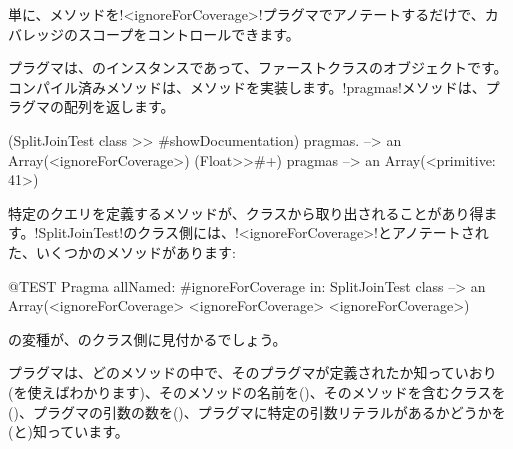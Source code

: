 \documentclass[a4paper,10pt,twoside]{book}
\begin{document}
単に、メソッドを\ct!<ignoreForCoverage>!プラグマでアノテートするだけで、カバレッジのスコープをコントロールできます。


%	


プラグマは、のインスタンスであって、ファーストクラスのオブジェクトです。コンパイル済みメソッドは、メソッドを実装します。\ct!pragmas!メソッドは、プラグマの配列を返します。

\begin{code}{}
(SplitJoinTest class >> #showDocumentation) pragmas.
  --> an Array(<ignoreForCoverage>)
(Float>>#+) pragmas --> an Array(<primitive: 41>)
\end{code}

特定のクエリを定義するメソッドが、クラスから取り出されることがあり得ます。\ct!SplitJoinTest!のクラス側には、\ct!<ignoreForCoverage>!とアノテートされた、いくつかのメソッドがあります:

\begin{code}{@TEST}
Pragma allNamed: #ignoreForCoverage in: SplitJoinTest class  --> an Array(<ignoreForCoverage> <ignoreForCoverage> <ignoreForCoverage>)
\end{code}

の変種が、のクラス側に見付かるでしょう。

プラグマは、どのメソッドの中で、そのプラグマが定義されたか知っていおり(を使えばわかります)、そのメソッドの名前を()、そのメソッドを含むクラスを()、プラグマの引数の数を()、プラグマに特定の引数リテラルがあるかどうかを(と)知っています。

\end{document}
